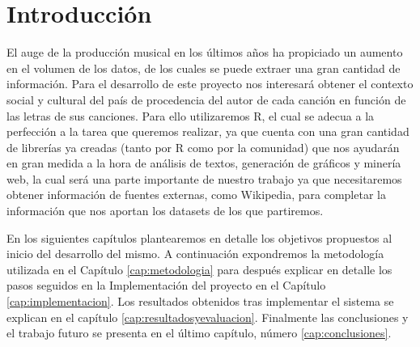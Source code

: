 \chapter{Introducción}
\label{cap:introduccion}

El auge de la producción musical en los últimos años ha propiciado un aumento en el volumen de los datos, de los cuales se puede extraer una gran cantidad de información. Para el desarrollo de este proyecto nos interesará obtener el contexto social y cultural del país de procedencia del autor de cada canción en función de las letras de sus canciones. Para ello utilizaremos R, el cual se adecua a la perfección a la tarea que queremos realizar, ya que cuenta con una gran cantidad de librerías ya creadas (tanto por R como por la comunidad) que nos ayudarán en gran medida a la hora de análisis de textos, generación de gráficos y minería web, la cual será una parte importante de nuestro trabajo ya que necesitaremos obtener información de fuentes externas, como Wikipedia, para completar la información que nos aportan los datasets de los que partiremos.


En los siguientes capítulos plantearemos en detalle los objetivos propuestos al inicio del desarrollo del mismo. A continuación expondremos la metodología utilizada en el Capítulo \ref{cap:metodologia} para después explicar en detalle los pasos seguidos en la Implementación del proyecto en el Capítulo \ref{cap:implementacion}. Los resultados obtenidos tras implementar el sistema se explican en el capítulo \ref{cap:resultadosyevaluacion}. Finalmente las conclusiones y el trabajo futuro se presenta en el último capítulo, número \ref{cap:conclusiones}.
